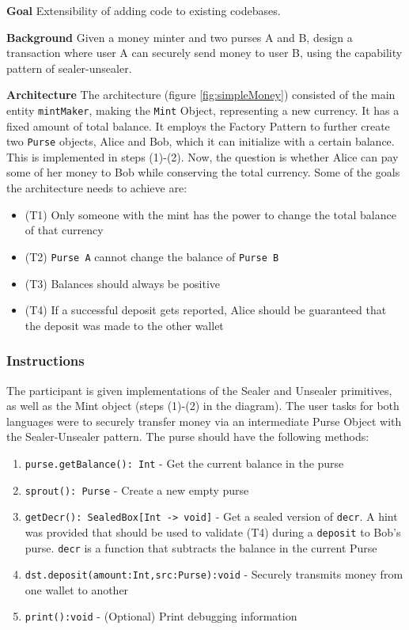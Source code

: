 \noindent
\textbf{Goal} Extensibility of adding code to existing codebases.

\noindent
\textbf{Background} Given a money minter and two purses A and B, design a transaction where user A can securely send money to user B, using the capability pattern of sealer-unsealer. 

\noindent
\textbf{Architecture}
The architecture (figure \ref{fig:simpleMoney}) consisted of the main entity \texttt{mintMaker}, making the \texttt{Mint} Object, representing a new currency. It has a fixed amount of total balance. It employs the Factory Pattern to further create two \texttt{Purse} objects, Alice and Bob, which it can initialize with a certain balance. This is implemented in steps (1)-(2). Now, the question is whether Alice can pay some of her money to Bob while conserving the total currency. Some of the goals the architecture needs to achieve \cite{millerFinancial} are:
\begin{itemize}
    \item (T1) Only someone with the mint has the power to change the total balance of that currency
    \item (T2) \texttt{Purse A} cannot change the balance of \texttt{Purse B}
    \item (T3) Balances should always be positive
    \item (T4) If a successful deposit gets reported, Alice should be guaranteed that the deposit was made to the other wallet
\end{itemize}

\subsubsection{Instructions}
\noindent
The participant is given implementations of the Sealer and Unsealer primitives, as well as the Mint object (steps (1)-(2) in the diagram). The user tasks for both languages were to securely transfer money via an intermediate Purse Object with the Sealer-Unsealer pattern. The purse should have the following methods:
\begin{enumerate}
    \item \texttt{purse.getBalance(): Int} - Get the current balance in the purse  
    \item \texttt{sprout(): Purse} - Create a new empty purse 
    \item \texttt{getDecr(): SealedBox[Int -> void]} - Get a sealed version of \texttt{decr}. A hint was provided that should be used to validate (T4) during a \texttt{deposit} to Bob's purse. \texttt{decr} is a function that subtracts the balance in the current Purse
    \item \texttt{dst.deposit(amount:Int,src:Purse):void} - Securely transmits money from one wallet to another
    \item \texttt{print():void} - (Optional) Print debugging information
\end{enumerate}

